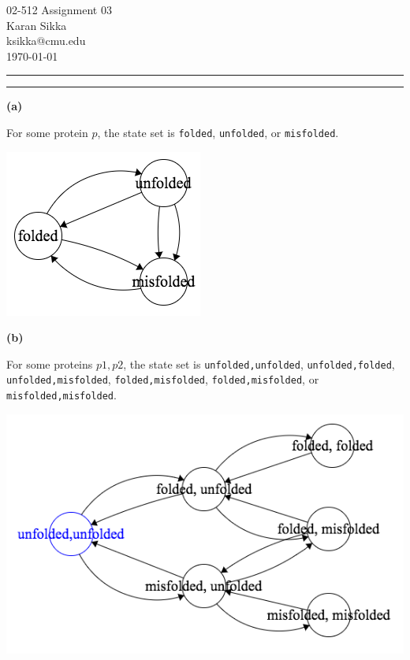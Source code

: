 \documentclass[11pt,letterpaper]{article}
\makeatletter
\newcommand{\question}[1] {\vspace{.25in} \hrule\vspace{0.5em}
\noindent{\bf #1} \vspace{0.5em}
\hrule \vspace{.10in}}
\renewcommand{\part}[1] {\vspace{.10in} {\bf (#1)}}
\newcommand{\myname}{Karan Sikka}
\newcommand{\myandrew}{ksikka@cmu.edu}
\newcommand{\myhwnum}{03}
\makeatother
\begin{document}
\medskip

\thispagestyle{plain}
\begin{center}                  %
{\Large 02-512 Assignment \myhwnum} \\
\myname \\
\myandrew \\
\today
\end{center}

\question{1}

\part{a}

For some protein $p$, the state set is
\texttt{folded},
\texttt{unfolded}, or
\texttt{misfolded}.

\includegraphics[scale=0.6]{1a}

\part{b}

For some proteins $p1,p2$, the state set is
\texttt{unfolded,unfolded},
\texttt{unfolded,folded},
\texttt{unfolded,misfolded},
\texttt{folded,misfolded},
\texttt{folded,misfolded}, or
\texttt{misfolded,misfolded}.

\includegraphics[scale=0.6]{1b}
\end{document}
